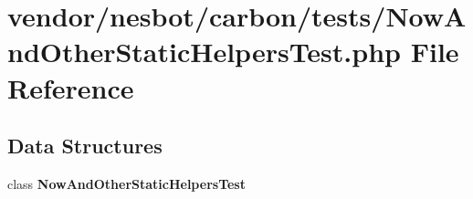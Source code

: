 \section{vendor/nesbot/carbon/tests/\+Now\+And\+Other\+Static\+Helpers\+Test.php File Reference}
\label{_now_and_other_static_helpers_test_8php}
\subsection*{Data Structures}
\begin{DoxyCompactItemize}
\item 
class {\bf Now\+And\+Other\+Static\+Helpers\+Test}
\end{DoxyCompactItemize}
